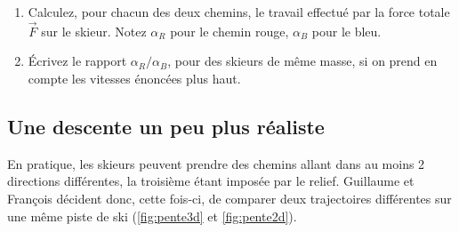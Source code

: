 \documentclass[10pt,oneside]{article}
\begin{document}
\begin{enumerate}
    \item Calculez, pour chacun des deux chemins, le travail effectué par la force totale $\vec{F}$ sur le skieur. Notez $\alpha_R$ pour le chemin rouge, $\alpha_B$ pour le bleu.
    \item Écrivez le rapport $\alpha_R/\alpha_B$, pour des skieurs de même masse, si on prend en compte les vitesses énoncées plus haut. 
\end{enumerate}

\subsection{Une descente un peu plus réaliste}

En pratique, les skieurs peuvent prendre des chemins allant dans au moins 2 directions différentes, la troisième étant imposée par le relief. Guillaume et François décident donc, cette fois-ci, de comparer deux trajectoires différentes sur une même piste de ski (\autoref{fig:pente3d} et \autoref{fig:pente2d}).
\end{document}
